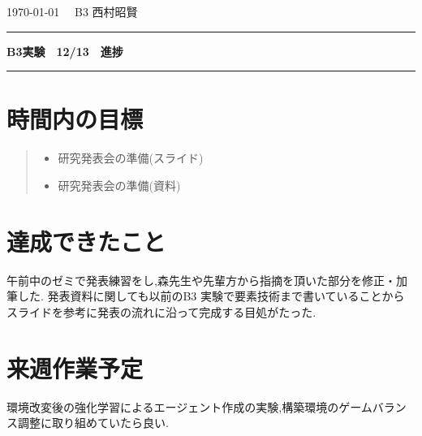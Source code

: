 \documentclass{jarticle}     %
\begin{document}
  \noindent
  \hspace{1em}

  \today
  \hfill
  \ \  B3 西村昭賢 

  \vspace{2mm}
  \hrule
  \begin{center}
  {\Large \bf B3実験　12/13　進捗}
  \end{center}
  \hrule
  \vspace{3mm}


\section{時間内の目標}
\begin{quote}
  \begin{itemize}
   \item 研究発表会の準備(スライド)
   \item 研究発表会の準備(資料)
  \end{itemize}
 \end{quote}

\section{達成できたこと}
午前中のゼミで発表練習をし,森先生や先輩方から指摘を頂いた部分を修正・加筆した.
発表資料に関しても以前のB3 実験で要素技術まで書いていることからスライドを参考に発表の流れに沿って完成する目処がたった.



\section{来週作業予定}
環境改変後の強化学習によるエージェント作成の実験,構築環境のゲームバランス調整に取り組めていたら良い.





\end{document}
